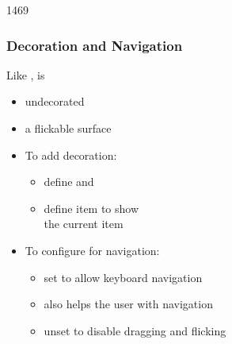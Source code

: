 \begin{slide}{1469}\frametitle{Decoration and Navigation}

Like ,  is

\begin{itemize}
\item undecorated
\item a flickable surface
\end{itemize}

\medskip
\begin{itemize}
\item To add decoration:
  \begin{itemize}
  \item define  and 
  \item define  item to show\\
        the current item
  \end{itemize}

\medskip
\item To configure for navigation:
  \begin{itemize}
  \item set  to allow keyboard navigation
  \item {} also helps the user with navigation
  \item unset  to disable dragging and flicking
  \end{itemize}
\end{itemize}

\vspace*{0.5em}

\end{slide}


